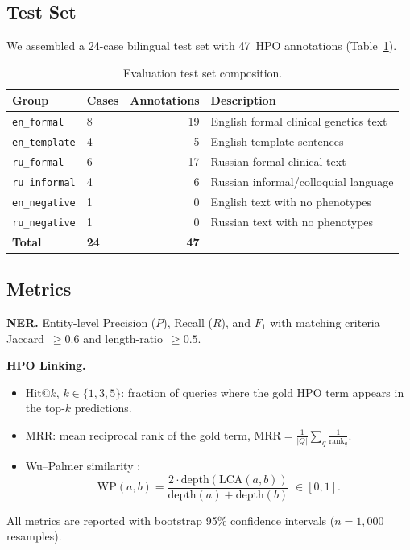 \documentclass[11pt,a4paper]{article}
\begin{document}
\subsection{Test Set}

We assembled a 24-case bilingual test set with 47~HPO annotations
(Table~\ref{tab:testset}).

\begin{table}[H]
\centering
\caption{Evaluation test set composition.}
\label{tab:testset}
\begin{tabular}{llrl}
\toprule
\textbf{Group} & \textbf{Cases} & \textbf{Annotations} & \textbf{Description} \\
\midrule
\texttt{en\_formal}   & 8 & 19 & English formal clinical genetics text \\
\texttt{en\_template} & 4 &  5 & English template sentences \\
\texttt{ru\_formal}   & 6 & 17 & Russian formal clinical text \\
\texttt{ru\_informal} & 4 &  6 & Russian informal/colloquial language \\
\texttt{en\_negative} & 1 &  0 & English text with no phenotypes \\
\texttt{ru\_negative} & 1 &  0 & Russian text with no phenotypes \\
\midrule
\textbf{Total}        & \textbf{24} & \textbf{47} & \\
\bottomrule
\end{tabular}
\end{table}

\subsection{Metrics}

\textbf{NER.}  Entity-level Precision ($P$), Recall ($R$), and $F_1$ with
matching criteria Jaccard~$\geq 0.6$ and length-ratio~$\geq 0.5$.

\textbf{HPO Linking.}
\begin{itemize}[nosep]
  \item $\text{Hit@}k$, $k \in \{1,3,5\}$: fraction of queries where the gold
        HPO term appears in the top-$k$ predictions.
  \item MRR: mean reciprocal rank of the gold term,
        $\mathrm{MRR} = \frac{1}{|Q|}\sum_{q} \frac{1}{\mathrm{rank}_q}$.
  \item Wu--Palmer similarity \cite{wu1994}:
        \begin{equation}
          \mathrm{WP}(a,b) =
          \frac{2\cdot\mathrm{depth}\!\left(\mathrm{LCA}(a,b)\right)}
               {\mathrm{depth}(a)+\mathrm{depth}(b)} \;\in [0,1].
          \label{eq:wp}
        \end{equation}
\end{itemize}
All metrics are reported with bootstrap 95\% confidence intervals ($n{=}1{,}000$
resamples).
\end{document}
